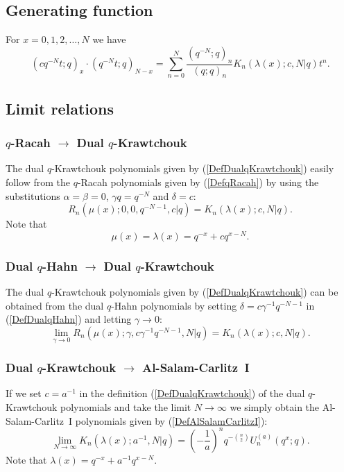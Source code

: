 \documentclass[envcountchap,graybox]{svmono}
\newcounter{rom}
\begin{document}
{\subsection*{Generating function} For $x=0,1,2,\ldots,N$ we have
\begin{equation}
\label{GenDualqKrawtchouk}
(cq^{-N}t;q)_x\cdot (q^{-N}t;q)_{N-x}=\sum_{n=0}^N
\frac{(q^{-N};q)_n}{(q;q)_n}K_n(\lambda(x);c,N|q)t^n.
\end{equation}

\subsection*{Limit relations}

\subsubsection*{$q$-Racah $\rightarrow$ Dual $q$-Krawtchouk}
The dual $q$-Krawtchouk polynomials given by (\ref{DefDualqKrawtchouk}) easily
follow from the $q$-Racah polynomials given by (\ref{DefqRacah}) by using the
substitutions $\alpha=\beta=0$, $\gamma q=q^{-N}$ and $\delta=c$:
$$R_n(\mu(x);0,0,q^{-N-1},c|q)=K_n(\lambda(x);c,N|q).$$
Note that
$$\mu(x)=\lambda(x)=q^{-x}+cq^{x-N}.$$

\subsubsection*{Dual $q$-Hahn $\rightarrow$ Dual $q$-Krawtchouk}
The dual $q$-Krawtchouk polynomials given by (\ref{DefDualqKrawtchouk}) can
be obtained from the dual $q$-Hahn polynomials by setting $\delta=c\gamma^{-1}q^{-N-1}$
in (\ref{DefDualqHahn}) and letting $\gamma\rightarrow 0$:
$$\lim_{\gamma\rightarrow 0}
R_n(\mu(x);\gamma,c\gamma^{-1}q^{-N-1},N|q)=K_n(\lambda(x);c,N|q).$$

\subsubsection*{Dual $q$-Krawtchouk $\rightarrow$ Al-Salam-Carlitz~I}
If we set $c=a^{-1}$ in the definition (\ref{DefDualqKrawtchouk})
of the dual $q$-Krawtchouk polynomials and take the limit
$N\rightarrow\infty$ we simply obtain the Al-Salam-Carlitz~I polynomials
given by (\ref{DefAlSalamCarlitzI}):
\begin{equation}
\lim_{N\rightarrow\infty}K_n(\lambda(x);a^{-1},N|q)=
\left(-\frac{1}{a}\right)^nq^{-\binom{n}{2}}U_n^{(a)}(q^x;q).
\end{equation}
Note that $\lambda(x)=q^{-x}+a^{-1}q^{x-N}$.

}
\end{document}
